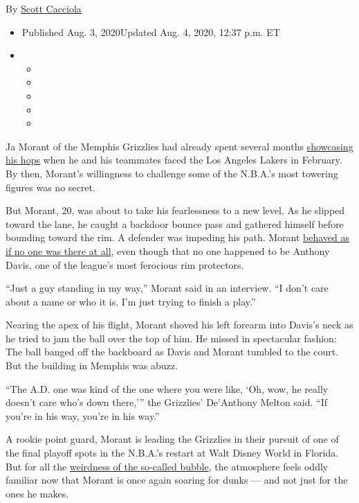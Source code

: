 By \href{https://www.nytimes3xbfgragh.onion/by/scott-cacciola}{Scott
Cacciola}

\begin{itemize}
\item
  Published Aug. 3, 2020Updated Aug. 4, 2020, 12:37 p.m. ET
\item
  \begin{itemize}
  \item
  \item
  \item
  \item
  \item
  \end{itemize}
\end{itemize}

Ja Morant of the Memphis Grizzlies had already spent several months
\href{https://www.nytimes3xbfgragh.onion/2019/11/02/sports/basketball/ja-morant-memphis-grizzlies.html}{showcasing
his hops} when he and his teammates faced the Los Angeles Lakers in
February. By then, Morant's willingness to challenge some of the
N.B.A.'s most towering figures was no secret.

But Morant, 20, was about to take his fearlessness to a new level. As he
slipped toward the lane, he caught a backdoor bounce pass and gathered
himself before bounding toward the rim. A defender was impeding his
path. Morant \href{https://www.youtube.com/watch?v=de0nkHhxGKI}{behaved
as if no one was there at all}, even though that no one happened to be
Anthony Davis, one of the league's most ferocious rim protectors.

``Just a guy standing in my way,'' Morant said in an interview. ``I
don't care about a name or who it is. I'm just trying to finish a
play.''

Nearing the apex of his flight, Morant shoved his left forearm into
Davis's neck as he tried to jam the ball over the top of him. He missed
in spectacular fashion: The ball banged off the backboard as Davis and
Morant tumbled to the court. But the building in Memphis was abuzz.

``The A.D. one was kind of the one where you were like, `Oh, wow, he
really doesn't care who's down there,''' the Grizzlies' De'Anthony
Melton said. ``If you're in his way, you're in his way.''

A rookie point guard, Morant is leading the Grizzlies in their pursuit
of one of the final playoff spots in the N.B.A.'s restart at Walt Disney
World in Florida. But for all the
\href{https://www.nytimes3xbfgragh.onion/2020/07/27/sports/basketball/coronavirus-nba-season-bubble-disney-world.html}{weirdness
of the so-called bubble}, the atmosphere feels oddly familiar now that
Morant is once again soaring for dunks --- and not just for the ones he
makes.

